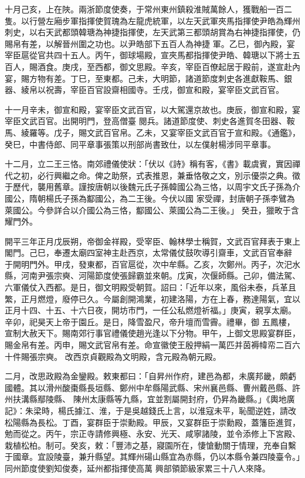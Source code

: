 \begin{pinyinscope}
 十月己亥，上在陜。兩浙節度使奏，于常州東州鎮殺淮賊萬餘人，獲戰船一百二隻。以行營左廂步軍指揮使賀瑰為左龍虎統軍，以左天武軍夾馬指揮使尹皓為輝州刺史，以右天武都頭韓瑭為神捷指揮使，左天武第三都頭胡賞為右神捷指揮使，仍賜帛有差，以解晉州圍之功也。以尹皓部下五百人為神捷
 軍。乙巳，御內殿，宴宰臣扈從官共四十五人。丙午，御球場殿，宣夾馬都指揮使尹皓、韓瑭以下將士五百人，賜酒食。庚戌，至西都，御文思殿。辛亥，宰臣百僚起居于殿前，遂宣赴內宴，賜方物有差。丁巳，至東都。己未，大明節，諸道節度刺史各進獻鞍馬、銀器、綾帛以祝壽，宰臣百官設齋相國寺。壬戌，御宣和殿，宴宰臣文武百官。



 十一月辛未，御宣和殿，宴宰臣文武百官，以大駕還京故也。庚辰，御宣和殿，宴宰臣文武百官。出開明門，登高僧臺
 閱兵。諸道節度使、刺史各進賀冬田器、鞍馬、綾羅等。戊子，賜文武百官帛。乙未，又宴宰臣文武百官于宣和殿。《通鑑》，癸巳，中書侍郎、同平章事張策以刑部尚書致仕，以左僕射楊涉同平章事。


十二月，立二王三恪。南郊禮儀使狀：「伏以《詩》稱有客，《書》載虞賓，實因禪代之初，必行興繼之命。俾之助祭，式表推恩，兼垂恪敬之文，別示優崇之典。徵于歷代，襲用舊章。謹按唐朝以後魏元氏子孫韓國公為三恪，以周宇文氏子孫為介國公，隋朝楊氏子孫為酅國公，為二王後。今伏以國
 家受禪，封唐朝子孫李鷿為萊國公。今參詳合以介國公為三恪，酅國公、萊國公為二王後。」
 癸丑，獵畋于含耀門外。


開平三年正月戊辰朔，帝御金祥殿，受宰臣、翰林學士稱賀，文武百官拜表于東上閣門。己巳，奉遷太廟四室神主赴西京，太常儀仗鼓吹導引齋車，文武百官奉辭
 于開明門外。甲戌，發東都，百官扈從，次中牟縣。乙亥，次鄭州。丙子，次汜水縣，河南尹張宗奭、河陽節度使張歸霸並來朝。戊寅，次偃師縣。己卯，備法駕、六軍儀仗入西都。是日，御文明殿受朝賀。詔曰：「近年以來，風俗未泰，兵革且繁，正月燃燈，廢停已久。今屬創開鴻業，初建洛陽，方在上春，務達陽氣，宜以正月十四、十五、十六日夜，開坊市門，一任公私燃燈祈福。」庚寅，親享太廟。辛卯，祀昊天上帝于園丘。是日，降雪盈尺，帝升壇而雪霽。禮畢，御
 五鳳樓，宣制大赦天下。賜南郊行事官禮儀使趙光逢以下分物。甲午，上御文思殿宴群臣，賜金帛有差。丙申，賜文武官帛有差。命宣徽使王殷押絹一萬匹并茵褥幃帟二百六十件賜張宗奭。
 改西京貞觀殿為文明殿，含元殿為朝元殿。



 二月，改思政殿為金鑾殿。敕東都曰：「自昇州作府，建邑為都，未廣邦畿，頗虧國體。其以滑州酸棗縣長垣縣、鄭州中牟縣陽武縣、宋州襄邑縣、曹州戴邑縣、許州扶溝縣鄢陵縣、
 陳州太康縣等九縣，宜並割屬開封府，仍昇為畿縣。」《輿地廣記》：朱梁時，楊氏據江、淮，于是吳越錢氏上言，以淮寇未平，恥聞逆姓，請改松陽縣為長松。丁酉，宴群臣于崇勳殿。甲辰，又宴群臣于崇勳殿，蓋籓臣進賀，勉而從之。丙午，宗正寺請修興極、永安、光天、咸寧諸陵，並令添修上下宮殿、栽植松柏。制可。癸亥，敕：「豐沛之基，寢園所在，悽愴動關于情理，充奉自繫于國章。宜設陵臺，兼升縣望。其輝州碭山縣宜為赤縣，仍以本縣令兼四陵臺令。」同州節度使劉知俊奏，延州都指揮使高萬
 興部領節級家累三十八人來降。




\end{pinyinscope}
